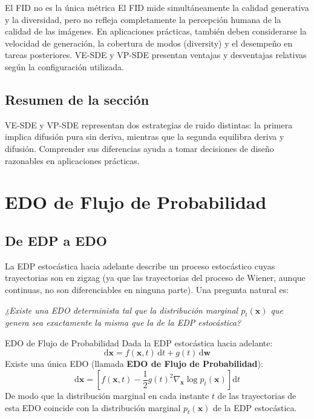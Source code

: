 \documentclass[a4paper]{article}
\begin{document}
\begin{warningbox}{El FID no es la única métrica}
El FID mide simultáneamente la calidad generativa y la diversidad, pero no refleja completamente la percepción humana de la calidad de las imágenes. En aplicaciones prácticas, también deben considerarse la velocidad de generación, la cobertura de modos (diversity) y el desempeño en tareas posteriores. VE-SDE y VP-SDE presentan ventajas y desventajas relativas según la configuración utilizada.
\end{warningbox}

\subsection{Resumen de la sección}

VE-SDE y VP-SDE representan dos estrategias de ruido distintas: la primera implica difusión pura sin deriva, mientras que la segunda equilibra deriva y difusión. Comprender sus diferencias ayuda a tomar decisiones de diseño razonables en aplicaciones prácticas.
\section{EDO de Flujo de Probabilidad}

\subsection{De EDP a EDO}

La EDP estocástica hacia adelante describe un proceso estocástico cuyas trayectorias son en zigzag (ya que las trayectorias del proceso de Wiener, aunque continuas, no son diferenciables en ninguna parte). Una pregunta natural es:

\textit{¿Existe una EDO determinista tal que la distribución marginal $p_t(\mathbf{x})$ que genera sea exactamente la misma que la de la EDP estocástica?}

\begin{importantbox}{EDO de Flujo de Probabilidad}
Dada la EDP estocástica hacia adelante:
$$
\mathrm{d}\mathbf{x} = f(\mathbf{x}, t)\,\mathrm{d}t + g(t)\,\mathrm{d}\mathbf{w}
$$
Existe una única EDO (llamada \textbf{EDO de Flujo de Probabilidad}):
$$
\mathrm{d}\mathbf{x} = \left[f(\mathbf{x}, t) - \frac{1}{2}g(t)^2 \nabla_{\mathbf{x}} \log p_t(\mathbf{x})\right]\mathrm{d}t
$$
De modo que la distribución marginal en cada instante $t$ de las trayectorias de esta EDO coincide con la distribución marginal $p_t(\mathbf{x})$ de la EDP estocástica.
\end{importantbox}
\end{document}
